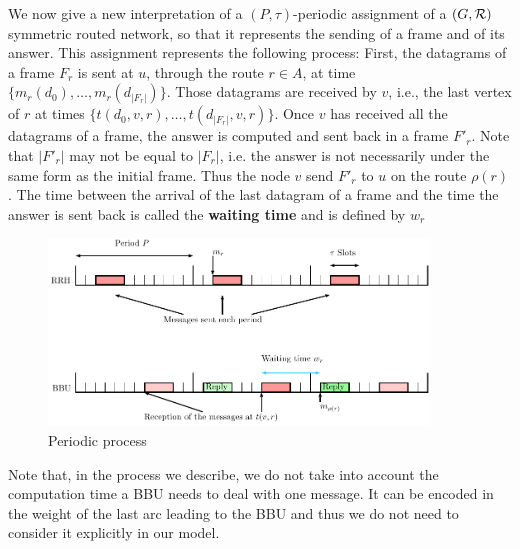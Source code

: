 \documentclass[10pt]{article}
\begin{document}
      We now give a new interpretation of a $(P,\tau)$-periodic assignment of a $(G,{\cal R})$ symmetric routed network, so that it represents the sending of a frame and of its answer.
      This assignment represents the following process: First, the datagrams of a frame $F_r$ is sent at $u$, through the route $r \in A$, at time $\{m_r(d_0),\ldots,m_r(d_{|F_r|}) \}$.
      Those datagrams are received by $v$, i.e., the last vertex of $r$ at times $\{t(d_0,v,r),\ldots,t(d_{|F_r|},v,r)\}$. 
     Once $v$ has received all the datagrams of a frame, the answer is computed and sent back in a frame $F'_r$. Note that $|F'_r|$ may not be equal to $|F_r|$, i.e. the answer is not necessarily under the same form as the initial frame. Thus the node $v$ send $F'_r$ to  $u$ on the route $\rho(r)$.
      The time between the arrival of the last datagram of a frame and the time the answer is sent back is called the \textbf{waiting time} and is defined by $w_r$%
 
     \begin{figure}[h]
      \begin{center}
      \includegraphics[width=0.90\textwidth]{rrh.pdf}
      \end{center}
      \caption{Periodic process}\label{fig:assignment}
      \end{figure}
      
      Note that, in the process we describe, we do not take into account the computation time a BBU needs to deal with one message. It can be encoded in the weight of the last arc leading to the BBU and thus we do not need to consider it explicitly in our model. 
      
\end{document}
